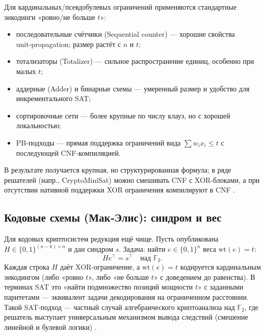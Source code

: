 Для кардинальных/псевдобулевых ограничений применяются стандартные энкодинги «ровно/не больше \(t\)»:
\begin{itemize}
  \item последовательные счётчики (Sequential counter) — хорошие свойства unit‑propagation; размер растёт с \(n\) и \(t\);
  \item тотализаторы (Totalizer) — сильное распространение единиц, особенно при малых \(t\);
  \item аддерные (Adder) и бинарные схемы — умеренный размер и удобство для инкрементального SAT;
  \item сортировочные сети — более крупные по числу клауз, но с хорошей локальностью;
  \item PB‑подходы — прямая поддержка ограничений вида \(\sum w_i x_i \le t\) с последующей CNF‑компиляцией.
\end{itemize}

В результате получается крупная, но структурированная формула; в ряде решателей (напр., CryptoMiniSat) можно смешивать CNF с XOR‑блоками, а при отсутствии нативной поддержки XOR ограничения компилируют в CNF \cite{Im2025}.

\subsection*{Кодовые схемы (Мак‑Элис): синдром и вес}
Для кодовых криптосистем редукция ещё чище. Пусть опубликована \(H \in \{0,1\}^{(n-k)\times n}\) и дан синдром \(s\). Задача: найти \(e \in \{0,1\}^n\) веса \(\mathrm{wt}(e)=t\):
\[
H e^{\top} = s^{\top} \quad \text{над } \mathbb{F}_2.
\]
Каждая строка \(H\) даёт XOR‑ограничение, а \(\mathrm{wt}(e)=t\) кодируется кардинальным энкодингом (либо «ровно \(t\)», либо «не больше \(t\)» с доведением до равенства). В терминах SAT это «найти подмножество позиций мощности \(t\)» с заданными паритетами — эквивалент задачи декодирования на ограниченном расстоянии. Такой SAT‑подход — частный случай алгебраического криптоанализа над \(\mathbb{F}_2\), где решатель выступает универсальным механизмом вывода следствий (смешение линейной и булевой логики) \cite{Zhang2000,Lafitte2014}.

